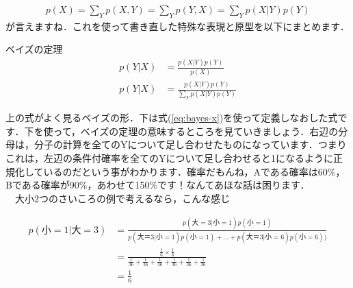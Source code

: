 \documentclass[11pt,a4paper,uplatex]{ujreport} 	%
\begin{document}
\begin{align}
\label{eq:bayes-x}
p(X) = \sum_Y p(X,Y) = \sum_Y p(Y,X) = \sum_Y p(X|Y)p(Y)
\end{align}
が言えますね．これを使って書き直した特殊な表現と原型を以下にまとめます．

\begin{screen}
ベイズの定理
\begin{align}
p(Y|X) &= \frac{p(X|Y)p(Y)}{p(X)}\\
p(Y|X) &= \frac{p(X|Y)p(Y)}{\sum_Y p(X|Y)p(Y)}
\end{align}
\end{screen}

上の式がよく見るベイズの形．下は式(\ref{eq:bayes-x})を使って定義しなおした式です．下を使って，ベイズの定理の意味するところを見ていきましょう．右辺の分母は，分子の計算を全てのYについて足し合わせたものになっています．つまりこれは，左辺の条件付確率を全てのYについて足し合わせると1になるように正規化しているのだという事がわかります．確率だもんね，Aである確率は60\%，Bである確率が90\%，あわせて150\%です！なんてあほな話は困ります．\\
　大小2つのさいころの例で考えるなら，こんな感じ


\begin{align}
p(小=1|大=3) &= \frac{p(大=3|小=1)p(小=1)}{p(大＝3|小=1)p(小=1) + ... + p(大＝3|小=6)p(小=6))}\\
&= \frac{\frac{1}{6} \times \frac{1}{6}}{\frac{1}{36} + \frac{1}{36} + \frac{1}{36} + \frac{1}{36} + \frac{1}{36}+ \frac{1}{36}}\\
&= \frac{1}{6}
\end{align}
\end{document}
